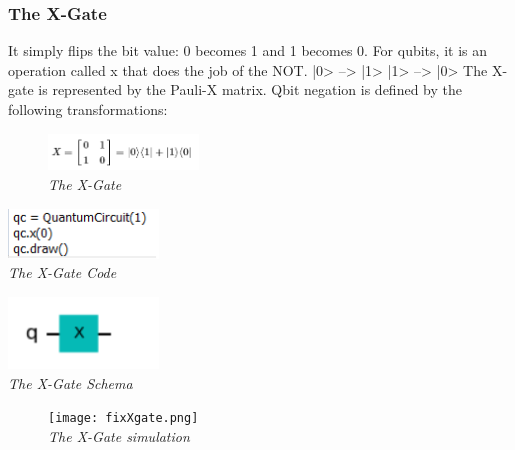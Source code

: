 \documentclass{article}
\begin{document}
\subsubsection{The X-Gate}
It simply flips the bit value: 0 becomes 1 and 1 becomes 0. For qubits, it is an operation called x that does the job of the NOT.
|0> --> |1> \tab |1> --> |0>
The X-gate is represented by the Pauli-X matrix.
Qbit negation is defined by the following transformations:
\begin{figure}[h]
\begin{center}
\begin{minipage}[b]{4cm}
\centering
\includegraphics[width=4cm]{x_gate.png}\\\textit{The X-Gate}
\end{minipage}
\end{center}
\end{figure}
\begin{mdframed}
\begin{center}
\begin{minipage}[b]{4cm}
\centering
\includegraphics[width=4cm]{x_code.png}\\\textit{The X-Gate Code}
\end{minipage}
\begin{minipage}[b]{4cm}
\centering
\includegraphics[width=4cm]{x_gate_schema.png}\\\textit{The X-Gate Schema}
\end{minipage}
\end{center}
\end{mdframed}
\begin{figure}[h]
\begin{center}
\begin{minipage}[b]{8cm}
\centering
\texttt{[image: fixXgate.png]}\\\textit{The X-Gate simulation}
\end{minipage}
\end{center}
\end{figure}
\newpage
\end{document}
